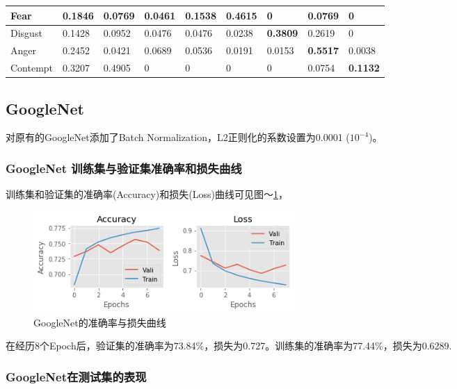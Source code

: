 \documentclass[11pt, a4paper]{article}
\begin{document}
\begin{CJK}{UTF8}{gbsn}
\begin{table}[htbp]
\begin{center}
\begin{tabular}{ | l | l | l | l | l |l | l |l | l | }
			Fear     & 0.1846  & 0.0769 & 0.0461  & 0.1538  & \textbf{0.4615}   & 0  & 0.0769 & 0 \\ \hline
			
			Disgust      &  0.1428  & 0.0952  & 0.0476    & 0.0476  & 0.0238   & \textbf{0.3809}  &  0.2619 & 0 \\ \hline
			
			Anger       & 0.2452   & 0.0421  & 0.0689   & 0.0536  & 0.0191   & 0.0153  & \textbf{0.5517} &  0.0038 \\ \hline
			
			Contempt   & 0.3207  & 0.4905  &  0  & 0 & 0  & 0 &  0.0754 & \textbf{0.1132} \\ \hline
		\end{tabular}
		\label{tab:res34_cm}
	\end{center}
\end{table}	


\subsection{GoogleNet}

对原有的GoogleNet添加了Batch Normalization，L2正则化的系数设置为0.0001 (${10}^{-4}$)。

\subsubsection{GoogleNet 训练集与验证集准确率和损失曲线}
训练集和验证集的准确率(Accuracy)和损失(Loss)曲线可见图～\ref{fig:gn_loss}，

\begin{figure}[htbp]
	\centering %
	
	\includegraphics[width=10cm]{goonet}
	\caption{GoogleNet的准确率与损失曲线}
	\label{fig:gn_loss}
\end{figure}

在经历8个Epoch后，验证集的准确率为73.84\%，损失为0.727。训练集的准确率为77.44\%，损失为0.6289.

\subsubsection{GoogleNet在测试集的表现}


\end{CJK}
\end{document}

